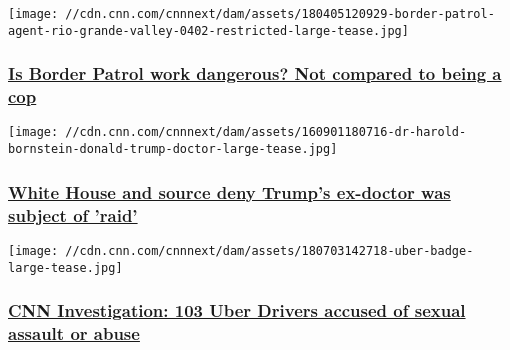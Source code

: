 \href{/2018/05/01/us/border-patrol-agent-less-dangerous-than-being-police-officer-invs/index.html}{}

\texttt{[image: //cdn.cnn.com/cnnnext/dam/assets/180405120929-border-patrol-agent-rio-grande-valley-0402-restricted-large-tease.jpg]}

\hypertarget{is-border-patrol-work-dangerous-not-compared-to-being-a-cop}{%
\subsubsection{\texorpdfstring{\href{/2018/05/01/us/border-patrol-agent-less-dangerous-than-being-police-officer-invs/index.html}{Is
Border Patrol work dangerous? Not compared to being a
cop}}{Is Border Patrol work dangerous? Not compared to being a cop}}\label{is-border-patrol-work-dangerous-not-compared-to-being-a-cop}}

\href{/2018/05/01/politics/trump-doctor-office-raided-trump-medical-records/index.html}{}

\texttt{[image: //cdn.cnn.com/cnnnext/dam/assets/160901180716-dr-harold-bornstein-donald-trump-doctor-large-tease.jpg]}

\hypertarget{white-house-and-source-deny-trumps-ex-doctor-was-subject-of-raid}{%
\subsubsection{\texorpdfstring{\href{/2018/05/01/politics/trump-doctor-office-raided-trump-medical-records/index.html}{White
House and source deny Trump's ex-doctor was subject of
'raid'}}{White House and source deny Trump's ex-doctor was subject of 'raid'}}\label{white-house-and-source-deny-trumps-ex-doctor-was-subject-of-raid}}

\href{https://money.cnn.com/2018/04/30/technology/uber-driver-sexual-assault/index.html}{}

\texttt{[image: //cdn.cnn.com/cnnnext/dam/assets/180703142718-uber-badge-large-tease.jpg]}

\hypertarget{cnn-investigation-103-uber-drivers-accused-of-sexual-assault-or-abuse}{%
\subsubsection{\texorpdfstring{\href{https://money.cnn.com/2018/04/30/technology/uber-driver-sexual-assault/index.html}{CNN
Investigation: 103 Uber Drivers accused of sexual assault or
abuse}}{CNN Investigation: 103 Uber Drivers accused of sexual assault or abuse}}\label{cnn-investigation-103-uber-drivers-accused-of-sexual-assault-or-abuse}}

